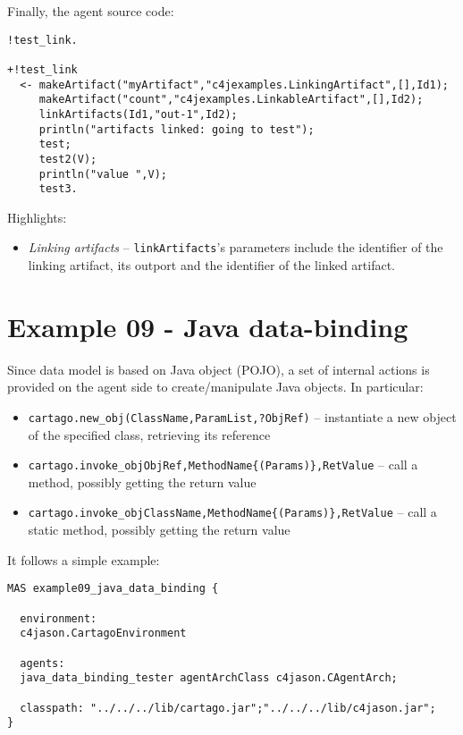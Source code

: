 \documentclass[11pt]{report}
\newcommand\code[1]{{\small{\mbox{\texttt{{#1}}}}}}
\newcommand{\cartago}{\mbox{\sf{CArtAgO}}}
\begin{document}
%
\noindent Finally, the agent source code:
%
{\small{\begin{verbatim}
!test_link.

+!test_link
  <- makeArtifact("myArtifact","c4jexamples.LinkingArtifact",[],Id1);
     makeArtifact("count","c4jexamples.LinkableArtifact",[],Id2);
     linkArtifacts(Id1,"out-1",Id2);      
     println("artifacts linked: going to test");
     test;
     test2(V);
     println("value ",V);
     test3.
\end{verbatim}}}

\noindent Highlights:
%
\begin{itemize}
%
\item \emph{Linking artifacts} -- \code{linkArtifacts}'s parameters include the identifier of the linking artifact, its outport and the identifier of the linked artifact.
%
\end{itemize} 



\newpage
\section{Example 09 - Java data-binding}

Since {\cartago} data model is based on Java object (POJO), a set of internal actions is provided on the agent side to create/manipulate Java objects.
%
In particular:
%
\begin{itemize}
\item \code{cartago.new\_obj(ClassName,ParamList,?ObjRef)} -- instantiate a new object of the specified class, retrieving its reference
\item \code{cartago.invoke\_obj{ObjRef,MethodName\{(Params)\},RetValue}} -- call a method, possibly getting the return value
\item \code{cartago.invoke\_obj{ClassName,MethodName\{(Params)\},RetValue}} -- call a static method, possibly getting the return value
\end{itemize}
%
It follows a simple example:
{\small{
\begin{verbatim}
MAS example09_java_data_binding {

  environment: 
  c4jason.CartagoEnvironment

  agents:  
  java_data_binding_tester agentArchClass c4jason.CAgentArch;

  classpath: "../../../lib/cartago.jar";"../../../lib/c4jason.jar";    
}
\end{verbatim}}}
\end{document}
